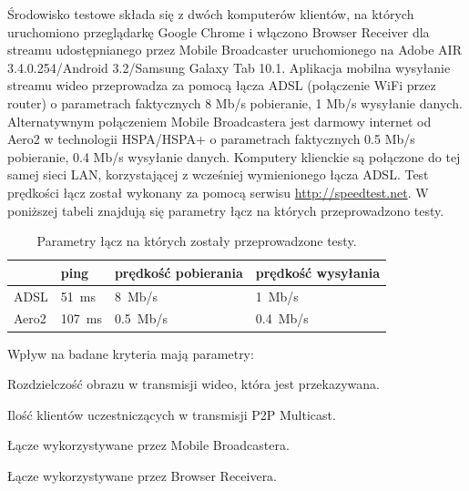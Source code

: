 Środowisko testowe składa się z dwóch komputerów klientów, na których uruchomiono przeglądarkę Google Chrome i włączono Browser Receiver dla streamu udostępnianego przez Mobile Broadcaster uruchomionego na Adobe AIR 3.4.0.254/Android 3.2/Samsung Galaxy Tab 10.1. Aplikacja mobilna wysyłanie streamu wideo przeprowadza za pomocą łącza ADSL (połączenie WiFi przez router) o parametrach faktycznych 8 Mb/s pobieranie, 1 Mb/s wysyłanie danych. Alternatywnym połączeniem Mobile Broadcastera jest darmowy internet od Aero2 w technologii HSPA/HSPA+ o parametrach faktycznych 0.5 Mb/s pobieranie, 0.4 Mb/s wysyłanie danych. Komputery klienckie są połączone do tej samej sieci LAN, korzystającej z wcześniej wymienionego łącza ADSL. Test prędkości łącz został wykonany za pomocą serwisu \url{http://speedtest.net}. W poniższej tabeli znajdują się parametry łącz na których przeprowadzono testy.

\begin{table}[h]
    \centering
    \begin{tabular}{|l|l|l|l|}
        \hline
        & ping & prędkość pobierania & prędkość wysyłania \\
        \hline
        ADSL
        &
        51~ms
        &
        8~Mb/s
        &
        1~Mb/s
        \\
        \hline
        Aero2
        &
        107~ms
        &
        0.5~Mb/s
        &
        0.4~Mb/s
        \\
        \hline
    \end{tabular}
    \caption{Parametry łącz na których zostały przeprowadzone testy.}
\end{table}

Wpływ na badane kryteria mają parametry:
\begin{packed_item}
    \item{Rozdzielczość obrazu w transmisji wideo, która jest przekazywana.}
    \item{Ilość klientów uczestniczących w transmisji P2P Multicast.}
    \item{Łącze wykorzystywane przez Mobile Broadcastera.}
    \item{Łącze wykorzystywane przez Browser Receivera.}
\end{packed_item}


